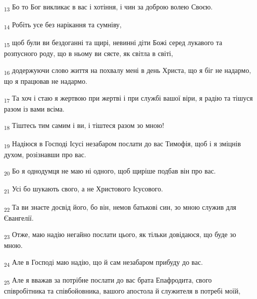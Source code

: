 \begin{tcolorbox}
\textsubscript{13} Бо то Бог викликає в вас і хотіння, і чин за доброю волею Своєю.
\end{tcolorbox}
\begin{tcolorbox}
\textsubscript{14} Робіть усе без нарікання та сумніву,
\end{tcolorbox}
\begin{tcolorbox}
\textsubscript{15} щоб були ви бездоганні та щирі, невинні діти Божі серед лукавого та розпусного роду, що в ньому ви сяєте, як світла в світі,
\end{tcolorbox}
\begin{tcolorbox}
\textsubscript{16} додержуючи слово життя на похвалу мені в день Христа, що я біг не надармо, що я працював не надармо.
\end{tcolorbox}
\begin{tcolorbox}
\textsubscript{17} Та хоч і стаю я жертвою при жертві і при службі вашої віри, я радію та тішуся разом із вами всіма.
\end{tcolorbox}
\begin{tcolorbox}
\textsubscript{18} Тіштесь тим самим і ви, і тіштеся разом зо мною!
\end{tcolorbox}
\begin{tcolorbox}
\textsubscript{19} Надіюся в Господі Ісусі незабаром послати до вас Тимофія, щоб і я зміцнів духом, розізнавши про вас.
\end{tcolorbox}
\begin{tcolorbox}
\textsubscript{20} Бо я однодумця не маю ні одного, щоб щиріше подбав він про вас.
\end{tcolorbox}
\begin{tcolorbox}
\textsubscript{21} Усі бо шукають свого, а не Христового Ісусового.
\end{tcolorbox}
\begin{tcolorbox}
\textsubscript{22} Та ви знаєте досвід його, бо він, немов батькові син, зо мною служив для Євангелії.
\end{tcolorbox}
\begin{tcolorbox}
\textsubscript{23} Отже, маю надію негайно послати цього, як тільки довідаюся, що буде зо мною.
\end{tcolorbox}
\begin{tcolorbox}
\textsubscript{24} Але в Господі маю надію, що й сам незабаром прибуду до вас.
\end{tcolorbox}
\begin{tcolorbox}
\textsubscript{25} Але я вважав за потрібне послати до вас брата Епафродита, свого співробітника та співбойовника, вашого апостола й служителя в потребі моїй,
\end{tcolorbox}
